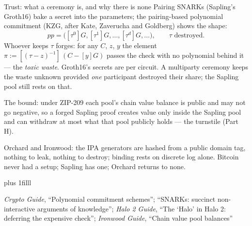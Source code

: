 \documentclass[aspectratio=169,11pt]{beamer}
\newcommand{\src}[1]{\par\vskip0pt plus 1filll
  {\fontsize{6}{7.2}\selectfont\color{arbdim}\raggedright #1\par}}
\begin{document}
\begin{frame}{Trust: what a ceremony is, and why there is none}
\small
Pairing SNARKs (Sapling's Groth16) bake a secret into the parameters;
the pairing-based polynomial commitment (KZG, after Kate, Zaverucha and
Goldberg) shows the shape:
\[
pp = \bigl([\tau^0]G, [\tau^1]G, \dots, [\tau^d]G, \dots\bigr),
\qquad \tau \text{ destroyed.}
\]
Whoever keeps $\tau$ forges: for any $C$, $z$, $y$ the element
$\pi := [(\tau - z)^{-1}]\,(C - [y]G)$ passes the check with no
polynomial behind it --- the \emph{toxic waste}. Groth16's secrets are
per circuit. A multiparty ceremony keeps the waste unknown provided
\emph{one} participant destroyed their share; the Sapling pool still
rests on that.

\smallskip
The bound: under ZIP-209 each pool's chain value balance is public and
may not go negative, so a forged Sapling proof creates value only
inside the Sapling pool and can withdraw at most what that pool
publicly holds --- the turnstile (Part H).

\smallskip
Orchard and Ironwood: the IPA generators are hashed from a public
domain tag, nothing to leak, nothing to destroy; binding rests on
discrete log alone. Bitcoin never had a setup; Sapling has one; Orchard
returns to none.
\src{\emph{Crypto Guide}, ``Polynomial commitment schemes''; ``SNARKs:
succinct non-interactive arguments of knowledge''; \emph{Halo 2 Guide},
``The `Halo' in Halo 2: deferring the expensive check'';
\emph{Ironwood Guide}, ``Chain value pool balances''}
\end{frame}
\end{document}
